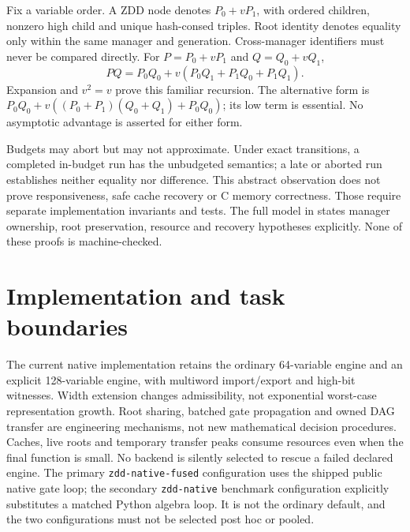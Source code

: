 \documentclass[10pt,a4paper]{article}
\begin{document}
Fix a variable order. A ZDD node denotes $P_0+vP_1$, with ordered children, nonzero high child
and unique hash-consed triples. Root identity denotes equality only within the same manager
and generation. Cross-manager identifiers must never be compared directly. For
$P=P_0+vP_1$ and $Q=Q_0+vQ_1$,
\begin{equation}\label{eq:product}
PQ=P_0Q_0+v(P_0Q_1+P_1Q_0+P_1Q_1).
\end{equation}
Expansion and $v^2=v$ prove this familiar recursion. The alternative form is
$P_0Q_0+v((P_0+P_1)(Q_0+Q_1)+P_0Q_0)$; its low term is essential. No asymptotic advantage
is asserted for either form.

Budgets may abort but may not approximate. Under exact transitions, a completed in-budget
run has the unbudgeted semantics; a late or aborted run establishes neither equality nor
difference. This abstract observation does not prove responsiveness, safe cache recovery
or C memory correctness. Those require separate implementation invariants and tests.
The full model in  states manager ownership, root preservation,
resource and recovery hypotheses explicitly. None of these proofs is machine-checked.

\section{Implementation and task boundaries}\label{sec:implementation}
The current native implementation retains the ordinary 64-variable engine and an explicit
128-variable engine, with multiword import/export and high-bit witnesses. Width extension
changes admissibility, not exponential worst-case representation growth. Root sharing,
batched gate propagation and owned DAG transfer are engineering mechanisms, not new
mathematical decision procedures. Caches, live roots and temporary transfer peaks consume
resources even when the final function is small. No backend is silently selected to rescue
a failed declared engine. The primary \texttt{zdd-native-fused} configuration uses the
shipped public native gate loop; the secondary \texttt{zdd-native} benchmark configuration
explicitly substitutes a matched Python algebra loop. It is not the ordinary default, and
the two configurations must not be selected post hoc or pooled.
\end{document}
